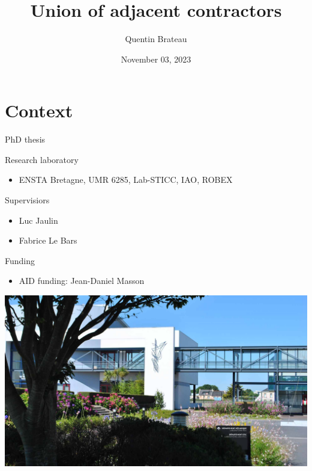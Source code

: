 \documentclass[10pt, xcolor={usenames, dvipsnames}]{beamer}
\title{Union of adjacent contractors}
\date{November 03, 2023}
\author{Quentin Brateau}
\institute{ENSTA Bretagne}
\begin{document}
    \maketitle

    \section{Context}

        \begin{frame}{PhD thesis}
            \centering
            \begin{minipage}[c]{0.58\textwidth}
                \begin{block}{Research laboratory}
                    \vspace{0.2cm}
                    \begin{itemize}
                        \item ENSTA Bretagne, UMR 6285, Lab-STICC, IAO, ROBEX
                    \end{itemize}
                \end{block}

                \begin{block}{Supervisiors}
                    \begin{itemize}
                        \item Luc Jaulin
                        \item Fabrice Le Bars
                    \end{itemize}
                \end{block}

                \begin{block}{Funding}
                    \begin{itemize}
                        \item AID funding: Jean-Daniel Masson
                    \end{itemize}
                \end{block}
            \end{minipage}
            \hfill
            \begin{minipage}[c]{0.4\textwidth}
                \includegraphics[height=0.7\textheight, trim={24cm 0 16cm 0}, clip]{imgs/ensta.jpg}
            \end{minipage}
        \end{frame}
\end{document}
